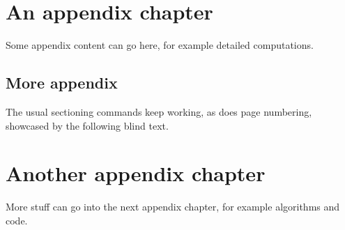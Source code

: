 
\appendix

\chapter{An appendix chapter}

Some appendix content can go here, for example detailed computations.

\section{More appendix}

The usual sectioning commands keep working, as does page numbering, showcased by the
following blind text.

\Blindtext

\chapter{Another appendix chapter}

More stuff can go into the next appendix chapter, for example algorithms and code.

\backmatter

\nocite{*}%

\label{ch:bibliography}
\printbibliography[%
    category=cited,%
]

\printbibliography[%
    notcategory=cited,%
    heading=notcited,%
    env=bibnonum,%
    prenote=further,%
]%

\printunsrtindex[%
    style=bookindex,%
]
